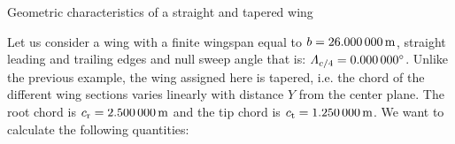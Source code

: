 \documentclass[[12pt,twoside]{book}
\begin{document}
\begin{myExampleX}{Geometric characteristics of a straight and tapered wing}{}%
\label{example:Geometric:Characteristics:Of:A:Straight:And:Tapered:Wing}
%

Let us consider a wing with a finite wingspan equal to $b=\SI[round-precision=0]{\mySpanWingMT}{\metre}$,
straight leading and trailing edges and null sweep angle that is: $\Lambda_{c/4}=\SI[round-precision=0]{\myLambdaCQuarterDeg}{\degree}$.
Unlike the previous example, the wing assigned here is tapered, i.e. the chord of the different wing sections varies linearly with distance $Y$ from the center plane. The root chord is
$c_\mathrm{r}=\SI[round-precision=2]{\myChordRootWingMT}{\metre}$ and the tip chord is $c_\mathrm{t}=\SI[round-precision=2]{\myChordTipWingMT}{\metre}$.
We want to calculate the following quantities:

\medskip


\end{myExampleX}
\end{document}
